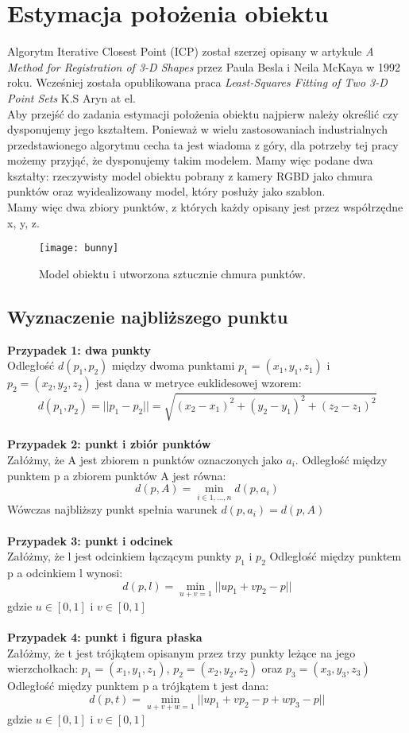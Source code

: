 \documentclass[12pt]{article}
\begin{document}
\newpage
\section{Estymacja położenia obiektu}
Algorytm Iterative Closest Point (ICP) został szerzej opisany w artykule \emph{A Method for Registration of 3-D Shapes} przez Paula Besla i Neila McKaya w 1992 roku. Wcześniej została opublikowana praca \emph{Least-Squares Fitting of Two 3-D Point Sets} K.S Aryn at el. 
\\
Aby przejść do zadania estymacji położenia obiektu najpierw należy określić czy dysponujemy jego kształtem. Ponieważ w wielu zastosowaniach industrialnych przedstawionego algorytmu cecha ta jest wiadoma z góry, dla potrzeby tej pracy możemy przyjąć, że dysponujemy takim modelem. Mamy więc podane dwa kształty: rzeczywisty model obiektu pobrany z kamery RGBD jako chmura punktów oraz wyidealizowany model, który posłuży jako szablon.
\\
Mamy więc dwa zbiory punktów, z których każdy opisany jest przez współrzędne x, y, z.

\begin{figure}[h]
\centering
\texttt{[image: bunny]}
\caption{Model obiektu i utworzona sztucznie chmura punktów.}
\end{figure}

\subsection{Wyznaczenie najbliższego punktu}

\textbf{Przypadek 1: dwa punkty}
\\
Odległość $d(p_{1}, p_{2})$ między dwoma punktami $p_{1} = (x_{1}, y_{1}, z_{1})$
i $p_{2} = (x_{2}, y_{2}, z_{2})$ jest dana w metryce euklidesowej wzorem: 
\[d(p_{1}, p_{2}) = ||p_{1} - p_{2}|| = \sqrt{(x_{2}-x_{1})^2+(y_{2}-y_{1})^2+(z_{2}-z_{1})^2}\]
\\
\textbf{Przypadek 2: punkt i zbiór punktów}
\\
Załóżmy, że A jest zbiorem n punktów oznaczonych jako $a_{i}$. Odległość między punktem p a zbiorem punktów A jest równa:
\[d(p, A) = \min_{i \in {1,...,n}} d(p, a_{i})\]
Wówczas najbliższy punkt spełnia warunek $d(p, a_{i}) = d(p, A)$
\\
\\
\textbf{Przypadek 3: punkt i odcinek}
\\
Załóżmy, że l jest odcinkiem łączącym punkty $p_{1}$ i $p_{2}$ Odległość między punktem p a odcinkiem l wynosi:
\[d(p, l) = \min_{u+v=1} ||up_{1}+vp_{2}-p|| \]
gdzie $u \in [0, 1]$ i $v \in [0, 1]$ 
\\
\\
\textbf{Przypadek 4: punkt i figura płaska}
\\
Załóżmy, że t jest trójkątem opisanym przez trzy punkty leżące na jego wierzchołkach: $p_{1} = (x_{1}, y_{1}, z_{1})$, $p_{2} = (x_{2}, y_{2}, z_{2})$ oraz $p_{3} = (x_{3}, y_{3}, z_{3})$ Odległość między punktem p a trójkątem t jest dana:
\[d(p, t) = \min_{u+v+w=1} ||up_{1}+vp_{2}-p+wp_{3}-p|| \]
gdzie $u \in [0, 1]$ i $v \in [0, 1]$ 
\\
\end{document}
